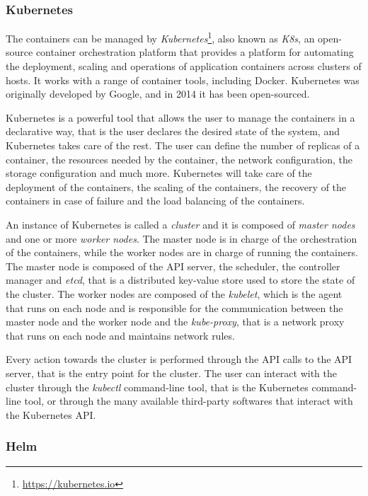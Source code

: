\subsubsection{Kubernetes}

The containers can be managed by \textit{Kubernetes}\footnote{\url{https://kubernetes.io}}, also known as \textit{K8s}, an open-source container orchestration platform that provides a platform for automating the deployment, scaling and operations of application containers across clusters of hosts. It works with a range of container tools, including Docker. Kubernetes was originally developed by Google, and in 2014 it has been open-sourced.~\cite{kubernetes-overview}

Kubernetes is a powerful tool that allows the user to manage the containers in a declarative way, that is the user declares the desired state of the system, and Kubernetes takes care of the rest. The user can define the number of replicas of a container, the resources needed by the container, the network configuration, the storage configuration and much more. Kubernetes will take care of the deployment of the containers, the scaling of the containers, the recovery of the containers in case of failure and the load balancing of the containers.

An instance of Kubernetes is called a \textit{cluster} and it is composed of \textit{master nodes} and one or more \textit{worker nodes}. The master node is in charge of the orchestration of the containers, while the worker nodes are in charge of running the containers. The master node is composed of the API server, the scheduler, the controller manager and \textit{etcd}, that is a distributed key-value store used to store the state of the cluster. The worker nodes are composed of the \textit{kubelet}, which is the agent that runs on each node and is responsible for the communication between the master node and the worker node and the \textit{kube-proxy}, that is a network proxy that runs on each node and maintains network rules.

Every action towards the cluster is performed through the API calls to the API server, that is the entry point for the cluster. The user can interact with the cluster through the \textit{kubectl} command-line tool, that is the Kubernetes command-line tool, or through the many available third-party softwares that interact with the Kubernetes API.

\subsubsection{Helm}

